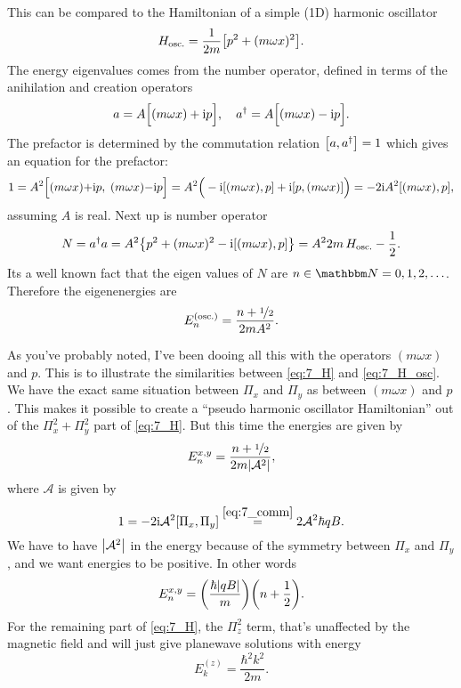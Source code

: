 \documentclass[11pt,letter, swedish, english
]{article}
\begin{document}
This can be compared to the Hamiltonian of a simple (1D) harmonic
oscillator 
\begin{equation}\label{eq:7_H_osc}
H_\text{osc.}=\frac{1}{2m}\qty[p^2+(m\omega x)^2].
\end{equation}
The energy eigenvalues comes from the number operator, defined in
terms of the anihilation and creation operators
\begin{equation}
a=A\Big[(m\omega x) +\ii p\Big]\qcomma
a^\dagger=A\Big[(m\omega x) -\ii p\Big].
\end{equation}
The prefactor is determined by the commutation
relation $\comm{a}{a^\dagger}=1$ which gives an equation for the prefactor:
\begin{equation}
1={A}^2\comm{(m\omega x){+}\ii p\Big.}{\;(m\omega x){-}\ii p}
={A}^2
\Big(-\ii\comm{(m\omega x)}{p} +\ii\comm{p}{(m\omega x)}\Big)
=-2\ii{A}^2\comm{(m\omega x)}{p},
\end{equation}
assuming $A$ is real. Next up is number operator
\begin{equation}
N=a^\dagger a = A^2\qty{p^2+(m\omega x)^2 
-\ii\comm{(m\omega x)}{p}}
=A^22m\,H_\text{osc.}-\frac{1}{2}.
\end{equation}
Its a well known fact that the eigen values of $N$ are 
$n\in\N={0, 1, 2,\ldots}$. Therefore the eigenenergies are
\begin{equation}
E_n^{(\text{osc.})}=\frac{n+\nicefrac{1}{2}}{2mA^2}.
\end{equation}

As you've probably noted, I've been dooing all this with the operators
$(m\omega x)$ and $p$. This is to illustrate the similarities between
\eqref{eq:7_H} and \eqref{eq:7_H_osc}. We have the exact same
situation between $\Pi_x$ and $\Pi_y$ as between $(m\omega x)$ and
$p$. This makes it possible to create a ``pseudo harmonic oscillator
Hamiltonian'' out of the $\Pi_x^2+\Pi_y^2$ part of \eqref{eq:7_H}. But
this time the energies  are given by
\begin{equation}
E_n^{x,y}=\frac{n+\nicefrac{1}{2}}{2m\abs{\mathcal{A}^2}},
\end{equation}
where $\mathcal{A}$ is given by
\begin{equation}
1=-2\ii\mathcal{A}^2\comm{\Pi_x}{\Pi_y}
\stackrel{\eqref{eq:7_comm}}{=}2\mathcal{A}^2\hbar qB.
\end{equation}
We have to have $\abs{\mathcal{A}^2}$ in the energy because of the
symmetry\footnotemark{} between $\Pi_x$ and $\Pi_y$, and we want
energies to be positive. In other words
\begin{equation}
E_n^{x,y}=\qty(\frac{\hbar\abs{qB}}{m})\qty(n+\frac{1}{2}).
\end{equation}
For the remaining part of \eqref{eq:7_H}, the $\Pi_z^2$ term, that's
unaffected by the magnetic field and will just give planewave
solutions with energy
\begin{equation}
E^{(z)}_k=\frac{\hbar^2k^2}{2m}.
\end{equation}
\end{document}

